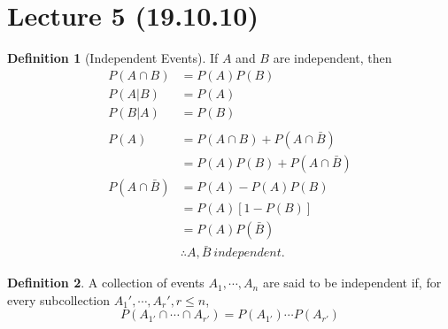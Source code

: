 \documentclass{article}
\let\ddd\cdots
\theoremstyle{definition}
\newtheorem{definition}{Definition}[section]
\theoremstyle{remark}
\theoremstyle{example}
\begin{document}
	\section*{Lecture 5 (19.10.10)}
	\begin{definition}[Independent Events]
		If $A$ and $B$ are independent, then \begin{align*}
			P(A \cap B) & = P(A)P(B)\\
			P(A|B) & = P(A)\\
			P(B|A) & = P(B)\\\\
			P(A)&=P(A \cap B)+P(A \cap \bar{B})\\
			& = P(A)P(B) + P(A \cap \bar{B})\\
			P(A \cap \bar{B})&=P(A)-P(A)P(B)\\
			& = P(A)\left[1-P(B)\right]\\
			& = P(A)P(\bar{B})\\
			& \therefore A, \bar{B}\ independent.
		\end{align*}
	\end{definition}

	\begin{definition}
		A collection of events $A_1,\ddd,A_n$ are said to be independent if, for every subcollection $A_1',\ddd,A_r', r \leq n$, \[
			P(A_{1'} \cap \ddd \cap A_{r'})=P(A_{1'}) \ddd P(A_{r'})
		\]
	\end{definition}
\end{document}
